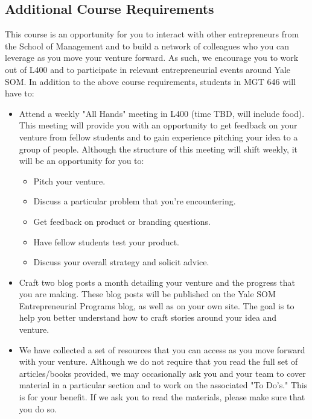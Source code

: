\subsection*{Additional Course Requirements}

This course is an opportunity for you to interact with other entrepreneurs from the School of Management and to build a network of colleagues who you can leverage as you move your venture forward. As such, we encourage you to work out of L400 and to participate in relevant entrepreneurial events around Yale SOM. In addition to the above course requirements, students in MGT 646 will have to:

\begin{itemize}
	\item Attend a weekly "All Hands" meeting in L400 (time TBD, will include food). This meeting will provide you with an opportunity to get feedback on your venture from fellow students and to gain experience pitching your idea to a group of people. Although the structure of this meeting will shift weekly, it will be an opportunity for you to:
		\begin{itemize}
				\item Pitch your venture.
				\item Discuss a particular problem that you're encountering.
				\item Get feedback on product or branding questions.
				\item Have fellow students test your product.
				\item Discuss your overall strategy and solicit advice.
			\end{itemize}
	\item Craft two blog posts a month detailing your venture and the progress that you are making. These blog posts will be published on the Yale SOM Entrepreneurial Programs blog, as well as on your own site. The goal is to help you better understand how to craft stories around your idea and venture.  
	\item We have collected a set of resources that you can access as you move forward with your venture. Although we do not require that you read the full set of articles/books provided, we may occasionally ask you and your team to cover material in a particular section and to work on the associated "To Do's." This is for your benefit. If we ask you to read the materials, please make sure that you do so.

\end{itemize}

